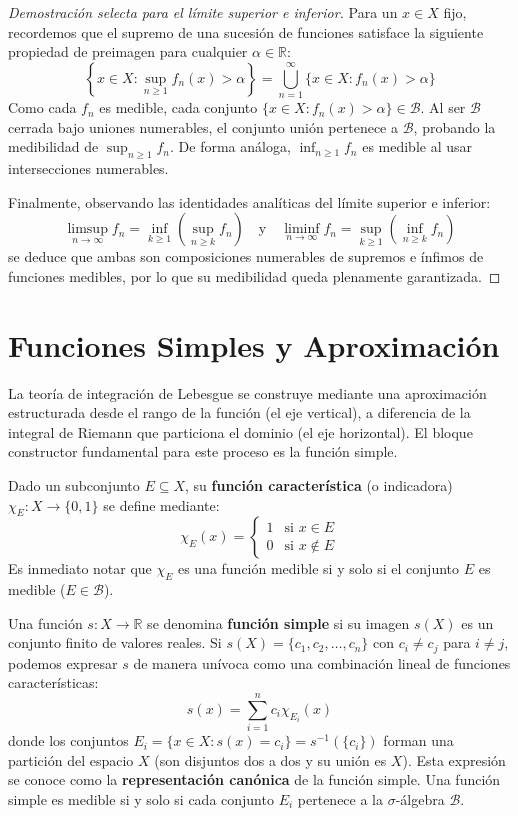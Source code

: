 \begin{proof}[Demostración selecta para el límite superior e inferior]
	Para un $x \in X$ fijo, recordemos que el supremo de una sucesión de funciones satisface la siguiente propiedad de preimagen para cualquier $\alpha \in \mathbb{R}$:
	$$ \left\{ x \in X : \sup_{n \ge 1} f_n(x) > \alpha \right\} = \bigcup_{n=1}^\infty \{x \in X : f_n(x) > \alpha\} $$
	Como cada $f_n$ es medible, cada conjunto $\{x \in X : f_n(x) > \alpha\} \in \mathcal{B}$. Al ser $\mathcal{B}$ cerrada bajo uniones numerables, el conjunto unión pertenece a $\mathcal{B}$, probando la medibilidad de $\sup_{n \ge 1} f_n$. De forma análoga, $\inf_{n \ge 1} f_n$ es medible al usar intersecciones numerables.
	
	Finalmente, observando las identidades analíticas del límite superior e inferior:
	$$ \limsup_{n \to \infty} f_n = \inf_{k \ge 1} \left( \sup_{n \ge k} f_n \right) \quad \text{y} \quad \liminf_{n \to \infty} f_n = \sup_{k \ge 1} \left( \inf_{n \ge k} f_n \right) $$
	se deduce que ambas son composiciones numerables de supremos e ínfimos de funciones medibles, por lo que su medibilidad queda plenamente garantizada.
\end{proof}

\section{Funciones Simples y Aproximación}

La teoría de integración de Lebesgue se construye mediante una aproximación estructurada desde el rango de la función (el eje vertical), a diferencia de la integral de Riemann que particiona el dominio (el eje horizontal). El bloque constructor fundamental para este proceso es la función simple.

\begin{definicion}
	Dado un subconjunto $E \subseteq X$, su \textbf{función característica} (o indicadora) $\chi_E: X \to \{0, 1\}$ se define mediante:
	$$ \chi_E(x) = \begin{cases} 1 & \text{si } x \in E \\ 0 & \text{si } x \notin E \end{cases} $$
	Es inmediato notar que $\chi_E$ es una función medible si y solo si el conjunto $E$ es medible ($E \in \mathcal{B}$).
\end{definicion}

\begin{definicion}
	Una función $s: X \to \mathbb{R}$ se denomina \textbf{función simple} si su imagen $s(X)$ es un conjunto finito de valores reales. Si $s(X) = \{c_1, c_2, \dots, c_n\}$ con $c_i \neq c_j$ para $i \neq j$, podemos expresar $s$ de manera unívoca como una combinación lineal de funciones características:
	$$ s(x) = \sum_{i=1}^n c_i \chi_{E_i}(x) $$
	donde los conjuntos $E_i = \{x \in X : s(x) = c_i\} = s^{-1}(\{c_i\})$ forman una partición del espacio $X$ (son disjuntos dos a dos y su unión es $X$). Esta expresión se conoce como la \textbf{representación canónica} de la función simple. Una función simple es medible si y solo si cada conjunto $E_i$ pertenece a la $\sigma$-álgebra $\mathcal{B}$.
\end{definicion}

